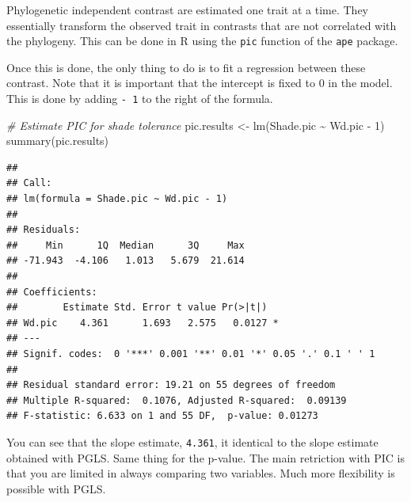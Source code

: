 \documentclass[
]{book}
\newenvironment{Shaded}{\begin{snugshade}}{\end{snugshade}}
\newcommand{\AttributeTok}[1]{\textcolor[rgb]{0.77,0.63,0.00}{#1}}
\newcommand{\CommentTok}[1]{\textcolor[rgb]{0.56,0.35,0.01}{\textit{#1}}}
\newcommand{\DecValTok}[1]{\textcolor[rgb]{0.00,0.00,0.81}{#1}}
\newcommand{\FunctionTok}[1]{\textcolor[rgb]{0.00,0.00,0.00}{#1}}
\newcommand{\NormalTok}[1]{#1}
\newcommand{\OtherTok}[1]{\textcolor[rgb]{0.56,0.35,0.01}{#1}}
\newcommand{\SpecialCharTok}[1]{\textcolor[rgb]{0.00,0.00,0.00}{#1}}
\begin{document}
Phylogenetic independent contrast are estimated one trait at a time. They essentially transform the observed trait in contrasts that are not correlated with the phylogeny. This can be done in R using the \texttt{pic} function of the \texttt{ape} package.

\begin{Shaded}
\end{Shaded}

Once this is done, the only thing to do is to fit a regression between these contrast. Note that it is important that the intercept is fixed to 0 in the model. This is done by adding \texttt{-\ 1} to the right of the formula.

\begin{Shaded}
\begin{Highlighting}[]
\CommentTok{\# Estimate PIC for shade tolerance}
\NormalTok{pic.results }\OtherTok{\textless{}{-}} \FunctionTok{lm}\NormalTok{(Shade.pic }\SpecialCharTok{\textasciitilde{}}\NormalTok{ Wd.pic }\SpecialCharTok{{-}} \DecValTok{1}\NormalTok{)}
\FunctionTok{summary}\NormalTok{(pic.results)}
\end{Highlighting}
\end{Shaded}

\begin{verbatim}
## 
## Call:
## lm(formula = Shade.pic ~ Wd.pic - 1)
## 
## Residuals:
##     Min      1Q  Median      3Q     Max 
## -71.943  -4.106   1.013   5.679  21.614 
## 
## Coefficients:
##        Estimate Std. Error t value Pr(>|t|)  
## Wd.pic    4.361      1.693   2.575   0.0127 *
## ---
## Signif. codes:  0 '***' 0.001 '**' 0.01 '*' 0.05 '.' 0.1 ' ' 1
## 
## Residual standard error: 19.21 on 55 degrees of freedom
## Multiple R-squared:  0.1076, Adjusted R-squared:  0.09139 
## F-statistic: 6.633 on 1 and 55 DF,  p-value: 0.01273
\end{verbatim}

You can see that the slope estimate, \texttt{4.361}, it identical to the slope estimate obtained with PGLS. Same thing for the p-value. The main retriction with PIC is that you are limited in always comparing two variables. Much more flexibility is possible with PGLS.
\end{document}
